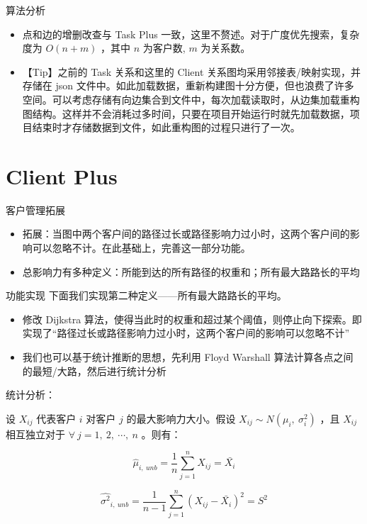 \documentclass{beamer}
\begin{document}
\begin{frame}{算法分析}
\begin{itemize}
\item 点和边的增删改查与 Task Plus 一致，这里不赘述。对于广度优先搜索，复杂度为 $O(n+m)$ ，其中 $n$ 为客户数, $m$ 为关系数。
\item 【Tip】之前的 Task 关系和这里的 Client 关系图均采用邻接表/映射实现，并存储在 json 文件中。如此加载数据，重新构建图十分方便，但也浪费了许多空间。可以考虑存储有向边集合到文件中，每次加载读取时，从边集加载重构图结构。这样并不会消耗过多时间，只要在项目开始运行时就先加载数据，项目结束时才存储数据到文件，如此重构图的过程只进行了一次。
\end{itemize}
\end{frame}


\section{Client Plus}


\begin{frame}{客户管理拓展}
\begin{itemize}
\item 拓展：当图中两个客户间的路径过长或路径影响力过小时，这两个客户间的影响可以忽略不计。在此基础上，完善这一部分功能。
\item 总影响力有多种定义：所能到达的所有路径的权重和；所有最大路路长的平均
\end{itemize}
\end{frame}


\begin{frame}{功能实现}
下面我们实现第二种定义——所有最大路路长的平均。
\begin{itemize}
\item 修改 Dijkstra 算法，使得当此时的权重和超过某个阈值，则停止向下探索。即实现了“路径过长或路径影响力过小时，这两个客户间的影响可以忽略不计”
\item 我们也可以基于统计推断的思想，先利用 Floyd Warshall 算法计算各点之间的最短/大路，然后进行统计分析
\end{itemize}

统计分析：

设 $X_{ij}$ 代表客户 $i$ 对客户 $j$ 的最大影响力大小。假设 $X_{ij} \sim N(\mu_i,\ \sigma_i^2)$ ，且 $X_{ij}$ 相互独立对于 $\forall\ j = 1,\ 2,\ \cdots,\ n$ 。则有：

\begin{equation*}
\hat{\mu}_{i,\ unb} = \frac{1}{n}\sum_{j=1}^n X_{ij} = \bar{X_i}
\end{equation*}

\begin{equation*}
\hat{\sigma^2}_{i,\ unb} = \frac{1}{n-1}\sum_{j=1}^n (X_{ij} - \bar{X_i})^2 = S^2
\end{equation*}
\end{frame}
\end{document}
